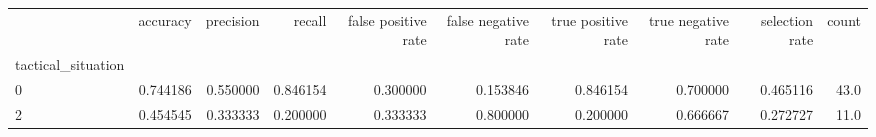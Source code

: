 \begin{tabular}{lrrrrrrrrr}
\toprule
{} &  accuracy &  precision &    recall &  false positive rate &  false negative rate &  true positive rate &  true negative rate &  selection rate &  count \\
tactical\_situation &           &            &           &                      &                      &                     &                     &                 &        \\
\midrule
0                  &  0.744186 &   0.550000 &  0.846154 &             0.300000 &             0.153846 &            0.846154 &            0.700000 &        0.465116 &   43.0 \\
2                  &  0.454545 &   0.333333 &  0.200000 &             0.333333 &             0.800000 &            0.200000 &            0.666667 &        0.272727 &   11.0 \\
\bottomrule
\end{tabular}
